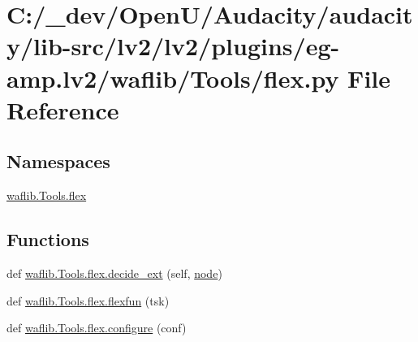 \hypertarget{lv2_2plugins_2eg-amp_8lv2_2waflib_2_tools_2flex_8py}{}\section{C\+:/\+\_\+dev/\+Open\+U/\+Audacity/audacity/lib-\/src/lv2/lv2/plugins/eg-\/amp.lv2/waflib/\+Tools/flex.py File Reference}
\label{lv2_2plugins_2eg-amp_8lv2_2waflib_2_tools_2flex_8py}
\subsection*{Namespaces}
\begin{DoxyCompactItemize}
\item 
 \hyperlink{namespacewaflib_1_1_tools_1_1flex}{waflib.\+Tools.\+flex}
\end{DoxyCompactItemize}
\subsection*{Functions}
\begin{DoxyCompactItemize}
\item 
def \hyperlink{namespacewaflib_1_1_tools_1_1flex_aac8b14ed3ea22ad22a4ead7f11b8667d}{waflib.\+Tools.\+flex.\+decide\+\_\+ext} (self, \hyperlink{structnode}{node})
\item 
def \hyperlink{namespacewaflib_1_1_tools_1_1flex_aed89723ff6789a05a9e312ca0ddb1acf}{waflib.\+Tools.\+flex.\+flexfun} (tsk)
\item 
def \hyperlink{namespacewaflib_1_1_tools_1_1flex_af98941bb6505104e007e22e2be6da162}{waflib.\+Tools.\+flex.\+configure} (conf)
\end{DoxyCompactItemize}
